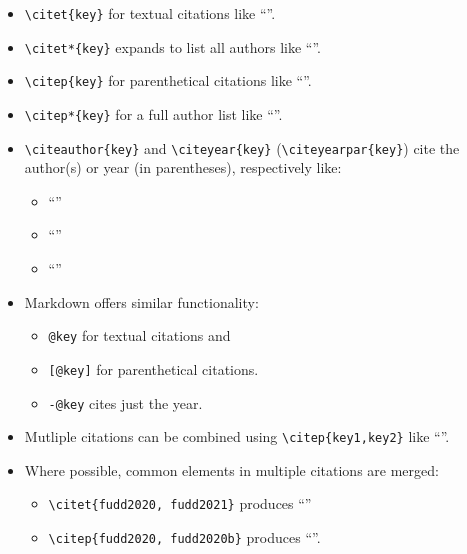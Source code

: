 \documentclass[
12pt,
a4paper,
twoside,
]{article}
\providecommand{\tightlist}{\setlength{\itemsep}{0pt}\setlength{\parskip}{0pt}}
\begin{document}
\begin{itemize}
\item
  \texttt{\textbackslash{}citet\{key\}} for textual citations like
  ``\citet{anderson_etal16}''.
\item
  \texttt{\textbackslash{}citet*\{key\}} expands to list all authors
  like ``\citet*{anderson_etal16}''.
\item
  \texttt{\textbackslash{}citep\{key\}} for parenthetical citations like
  ``\citep{anderson_etal16}''.
\item
  \texttt{\textbackslash{}citep*\{key\}} for a full author list like
  ``\citep*{anderson_etal16}''.
\item
  \texttt{\textbackslash{}citeauthor\{key\}} and
  \texttt{\textbackslash{}citeyear\{key\}}
  (\texttt{\textbackslash{}citeyearpar\{key\}}) cite the author(s) or
  year (in parentheses), respectively like:

  \begin{itemize}
  \tightlist
  \item
    ``\citeauthor{anderson_vanwincoop03}''
  \item
    ``\citeyear{anderson_vanwincoop03}''
  \item
    ``\citeyearpar{anderson_vanwincoop03}''
  \end{itemize}
\item
  Markdown offers similar functionality:

  \begin{itemize}
  \tightlist
  \item
    \texttt{@key} for textual citations and
  \item
    \texttt{{[}@key{]}} for parenthetical citations.
  \item
    \texttt{-@key} cites just the year.
  \end{itemize}
\item
  Mutliple citations can be combined using
  \texttt{\textbackslash{}citep\{key1,key2\}} like
  ``\citep{anderson_etal16, anderson_vanwincoop03}''.
\item
  Where possible, common elements in multiple citations are merged:

  \begin{itemize}
  \tightlist
  \item
    \texttt{\textbackslash{}citet\{fudd2020,\ fudd2021\}} produces
    ``\citet{fudd2020, fudd2021}''
  \item
    \texttt{\textbackslash{}citep\{fudd2020,\ fudd2020b\}} produces
    ``\citep{fudd2020, fudd2020b}''.
  \end{itemize}
\end{itemize}
\end{document}
